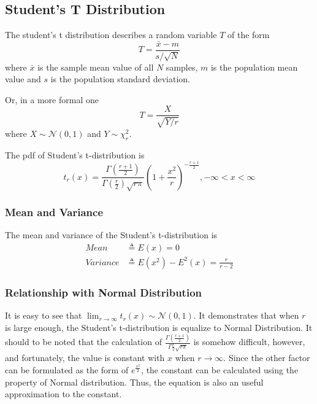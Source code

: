 \subsection{Student's T Distribution}

The student's t distribution describes a random variable $T$ of the form
\begin{equation}
    T = \frac{\bar{x} - m}{s / \sqrt{N}}
\end{equation}
where $\bar{x}$ is the sample mean value of all $N$ samples, $m$ is the population mean value and $s$ is the population standard deviation.

Or, in a more formal one
\begin{equation}
    T = \frac{X}{\sqrt{Y/r}}
\end{equation}
where $X \sim \mathcal{N}(0, 1)$ and $Y \sim \chi_r^2$.

The pdf of Student's t-distribution is
\begin{equation}
    \label{Equation: Pdf of Student's T Distribution}
    t_r(x) = \frac{\Gamma(\frac{r+1}{2})}{\Gamma(\frac{r}{2}) \sqrt{r\pi}} (1+\frac{x^2}{r})^{-\frac{r+1}{2}}, -\infty < x < \infty
\end{equation}

\subsubsection{Mean and Variance}

The mean and variance of the Student's t-distribution is
\begin{align*}
    Mean     & \triangleq E(x) = 0                        \\
    Variance & \triangleq E(x^2) - E^2(x) = \frac{r}{r-2}
\end{align*}

\subsubsection{Relationship with Normal Distribution}

It is easy to see that $\lim_{r \to \infty} t_r(x) \sim \mathcal{N}(0, 1)$.
It demonstrates that when $r$ is large enough, the Student's t-distribution is equalize to Normal Distribution.
It should to be noted that the calculation of $\frac{\Gamma(\frac{r+1}{2})}{\Gamma{\frac{r}{2}} \sqrt{r \pi}}$ is somehow difficult,
however, and fortunately, the value is constant with $x$ when $r \rightarrow \infty$.
Since the other factor can be formulated as the form of $e^\frac{x^2}{2}$,
the constant can be calculated using the property of Normal distribution.
Thus, the equation is also an useful approximation to the constant.

